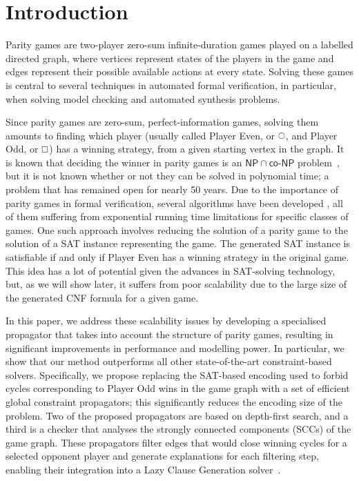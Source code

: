 \documentclass[runningheads]{llncs}
\begin{document}
\section{Introduction}

Parity games are two-player zero-sum infinite-duration games played on a labelled directed graph, where vertices represent states of the players in the game and edges represent their possible available actions at every state. 
Solving these games is central to several techniques in automated formal verification, in particular, when solving model checking and automated synthesis problems.

Since parity games are zero-sum, perfect-information games, solving them amounts to finding which player (usually called Player Even, or $\even$, and Player Odd, or $\odd$) has a winning strategy, from a given starting vertex in the graph. 
It is known that deciding the winner in parity games is an $\mathsf{NP} \cap \mathsf{co\textit{-}NP}$ problem~\cite{Jurdziński:1998}, but it is not known whether or not they can be solved in polynomial time; a problem that has remained open for nearly 50 years. 
% 
Due to the importance of parity games in formal verification, several algorithms have been developed \cite{Aggarwal:2023,Benerecetti:2025,Jurdziński:2000,Jurdziński:2022,Zielonka:1998}, all of them suffering from exponential running time limitations for specific classes of games. 
One such approach involves reducing the solution of a parity game to the solution of a SAT instance representing the game. The generated SAT instance is satisfiable if and only if Player Even has a winning strategy in the original game. 
This idea has a lot of potential given the advances in SAT-solving technology, but, as we will show later, it suffers from poor scalability due to the large size of the generated CNF formula for a given game.

In this paper, we address these scalability issues by developing a specialised propagator that takes into account the structure of parity games, resulting in significant improvements in performance and modelling power. 
In particular, we show that our method outperforms all other state-of-the-art constraint-based solvers.
%
Specifically, we propose replacing the SAT-based encoding used to forbid cycles corresponding to Player Odd wins in the game graph \cite{Heljanko:2012} with a set of efficient global constraint propagators; this significantly reduces the encoding size of the problem. Two of the proposed propagators are based on depth-first search, and a third is a checker that analyses the strongly connected components (SCCs) of the game graph. These propagators filter edges that would close winning cycles for a selected opponent player and generate explanations for each filtering step, enabling their integration into a Lazy Clause Generation solver~\cite{DBLP:journals/constraints/OhrimenkoSC09}.
\end{document}
